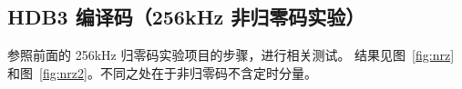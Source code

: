 \documentclass[../main]{subfiles}
\begin{document}
\subsection{HDB3 编译码（256kHz 非归零码实验）}%
\label{sub:nrz}



参照前面的 256kHz 归零码实验项目的步骤，进行相关测试。
结果见图~\ref{fig:nrz}和图~\ref{fig:nrz2}。不同之处在于非归零码不含定时分量。
\end{document}
